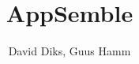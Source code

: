 \documentclass[]{report}
\title{AppSemble}
\author{David Diks, Guus Hamm}
\begin{document}
\maketitle

\begin{abstract}
\end{abstract}
\end{document}
